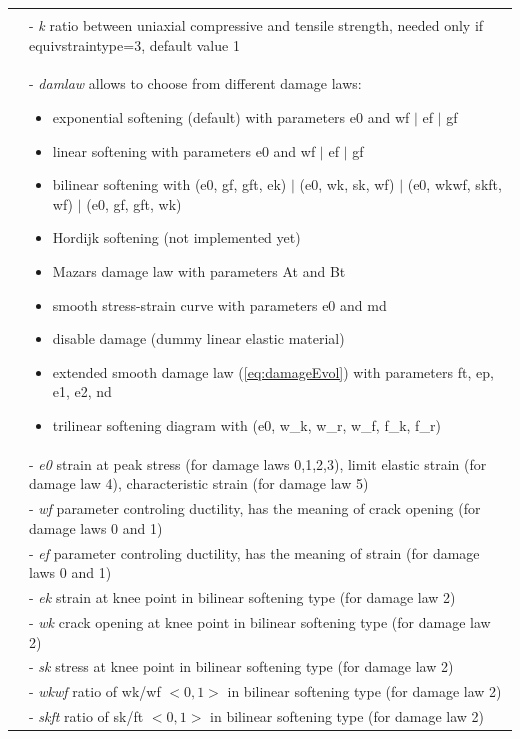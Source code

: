 \documentclass[a4paper]{article}
\newcommand{\param}[1]{{\it #1}}
\begin{document}
\begin{longtable}{|l|p{9cm}|}
\begin{itemize}
\end{itemize}\\
&- \param{k} ratio between uniaxial compressive and tensile strength, needed only if equivstraintype=3, default value 1\\
&- \param{damlaw} allows to choose from different damage laws:
\begin{itemize}\setlength{\itemsep}{-3pt}
\item[0 -] exponential softening (default) with parameters e0 and wf $\vert$ ef $\vert$ gf
\item[1 -] linear softening with parameters e0 and wf $\vert$ ef $\vert$ gf
\item[2 -] bilinear softening with (e0, gf, gft, ek) $\vert$ (e0, wk, sk, wf) $\vert$ (e0, wkwf, skft, wf) $\vert$ (e0, gf, gft, wk)
\item[3 -] Hordijk softening (not implemented yet)
\item[4 -] Mazars damage law with parameters At and Bt
\item[5 -] smooth stress-strain curve with parameters e0 and md
\item[6 -] disable damage (dummy linear elastic material)
\item[7 -] extended smooth damage law (\ref{eq:damageEvol}) with parameters ft, ep, e1, e2, nd
\item[11 -] trilinear softening diagram with (e0, w\_k, w\_r, w\_f, f\_k, f\_r)
\end{itemize}\\
&- \param{e0} strain at peak stress (for damage laws 0,1,2,3), limit elastic strain (for damage law 4), characteristic strain (for damage law 5)\\
&- \param{wf} parameter controling ductility, has the meaning of crack opening (for damage laws 0 and 1)\\
&- \param{ef} parameter controling ductility, has the meaning of strain (for damage laws 0 and 1)\\
&- \param{ek} strain at knee point in bilinear softening type (for damage law 2)\\
&- \param{wk} crack opening at knee point in bilinear softening type (for damage law 2)\\
&- \param{sk} stress at knee point in bilinear softening type (for damage law 2)\\
&- \param{wkwf} ratio of wk/wf $<0,1>$ in bilinear softening type (for damage law 2)\\
&- \param{skft} ratio of sk/ft $<0,1>$ in bilinear softening type (for damage law 2)\\

\end{longtable}
\end{document}
